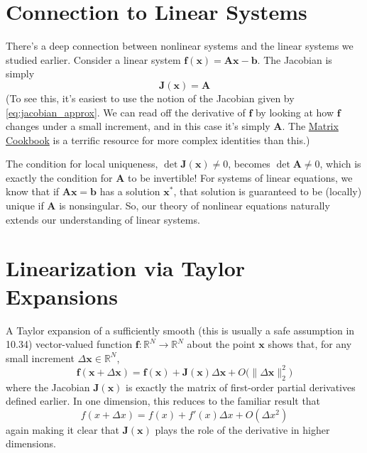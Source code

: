 \section{Connection to Linear Systems}

There's a deep connection between nonlinear systems and the linear systems we studied earlier. Consider a linear system $\mathbf{f}(\mathbf{x}) = \mathbf{A}\mathbf{x} - \mathbf{b}$. The Jacobian is simply
\begin{equation}
\mathbf{J}(\mathbf{x}) = \mathbf{A}
\end{equation}
(To see this, it's easiest to use the notion of the Jacobian given by \autoref{eq:jacobian_approx}. We can read off the derivative of $\mathbf f$ by looking at how $\mathbf f$ changes under a small increment, and in this case it's simply $\mathbf A$. The \href{https://www.math.uwaterloo.ca/~hwolkowi/matrixcookbook.pdf}{Matrix Cookbook} is a terrific resource for more complex identities than this.)

The condition for local uniqueness, $\det \mathbf{J}(\mathbf{x}) \neq 0$, becomes $\det \mathbf{A} \neq 0$, which is exactly the condition for $\mathbf{A}$ to be invertible! For systems of linear equations, we know that if $\mathbf{Ax=b}$ has a solution $\mathbf x^*$, that solution is guaranteed to be (locally) unique if $\mathbf{A}$ is nonsingular. So, our theory of nonlinear equations naturally extends our understanding of linear systems.

\section{Linearization via Taylor Expansions}
\label{sec:sne_linearization_taylor}
A Taylor expansion of a sufficiently smooth (this is usually a safe assumption in 10.34) vector-valued function 
\(\mathbf f\colon\mathbb R^N\to\mathbb R^N\) about the point \(\mathbf x\) shows that, for any small increment \(\Delta\mathbf x\in\mathbb R^N\),
\begin{equation}
\mathbf f(\mathbf x + \Delta\mathbf x) = \mathbf f(\mathbf x) +\mathbf{J}(\mathbf x) \Delta\mathbf x +O\bigl(\|\Delta\mathbf x\|_2^2\bigr)
\end{equation}
where the Jacobian \(\mathbf{J}(\mathbf x)\) is exactly the matrix of first-order partial derivatives defined earlier.  In one dimension, this reduces to the familiar result that
\begin{equation}
f(x+\Delta x)=f(x)+f'(x)\Delta x+ O(\Delta x^2)
\end{equation}
again making it clear that \(\mathbf{J}(\mathbf x)\) plays the role of the derivative in higher dimensions.

